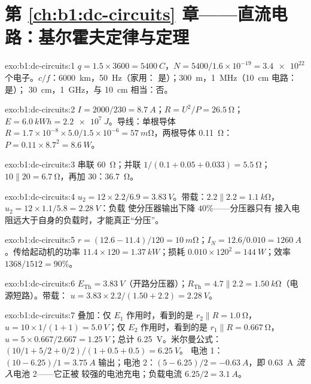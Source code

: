 \section*{第 \ref{ch:b1:dc-circuits} 章——直流电路：基尔霍夫定律与定理}

\begin{solution}{exo:b1:dc-circuits:1}
$q = 1.5 \times 3600 = \qty{5400}{C}$，$N = 5400/1.6\times10^{-19} =
\num{3.4e22}$ 个电子。$c/f$：\qty{6000}{km}，\qty{50}{Hz}（家用：
是）；\qty{300}{m}，\qty{1}{MHz}（\qty{10}{cm} 电路：是）；
\qty{30}{cm}，\qty{1}{GHz}，与 \qty{10}{cm} 相当：否。
\end{solution}

\begin{solution}{exo:b1:dc-circuits:2}
$I = 2000/230 = \qty{8.7}{A}$；$R = U^2/P = \qty{26.5}{\ohm}$；$E =
\qty{6.0}{kWh} = \qty{2.2e7}{J}$。导线：单根导体 $R = 1.7\times10^{-8}
\times 5.0/1.5\times10^{-6} = \qty{57}{m\ohm}$，两根导体
\qty{0.11}{\ohm}：$P = 0.11 \times 8.7^2 = \qty{8.6}{W}$。
\end{solution}

\begin{solution}{exo:b1:dc-circuits:3}
串联 \qty{60}{\ohm}；并联 $1/(0.1 + 0.05 + 0.033) = \qty{5.5}{\ohm}$；
$10 \parallel 20 = \qty{6.7}{\ohm}$，再加 $30$：\qty{36.7}{\ohm}。
\end{solution}

\begin{solution}{exo:b1:dc-circuits:4}
$u_2 = 12 \times 2.2/6.9 = \qty{3.83}{V}$。带载：$2.2 \parallel 2.2 =
\qty{1.1}{k\ohm}$，$u_2 = 12 \times 1.1/5.8 = \qty{2.28}{V}$：负载
使分压器输出下降 $40\%$——分压器只有
接入电阻远大于自身的负载时，才能真正“分压”。
\end{solution}

\begin{solution}{exo:b1:dc-circuits:5}
$r = (12.6 - 11.4)/120 = \qty{10}{m\ohm}$；$I_N = 12.6/0.010 =
\qty{1260}{A}$。传给起动机的功率 $11.4 \times 120 = \qty{1.37}{kW}$；损耗
$0.010 \times 120^2 = \qty{144}{W}$；效率 $1368/1512 = 90\%$。
\end{solution}

\begin{solution}{exo:b1:dc-circuits:6}
$E_{\mathrm{Th}} = \qty{3.83}{V}$（开路分压器）；$R_{\mathrm{Th}}
= 4.7 \parallel 2.2 = \qty{1.50}{k\ohm}$（电源短路）。带载：
$u = 3.83 \times 2.2/(1.50 + 2.2) = \qty{2.28}{V}$。
\end{solution}

\begin{solution}{exo:b1:dc-circuits:7}
叠加：仅 $E_1$ 作用时，看到的是 $r_2 \parallel R = \qty{1.0}{\ohm}$，
$u = 10 \times 1/(1 + 1) = \qty{5.0}{V}$；仅 $E_2$ 作用时，看到的是 $r_1 \parallel R
= \qty{0.667}{\ohm}$，$u = 5 \times 0.667/2.667 = \qty{1.25}{V}$；总计
\qty{6.25}{V}。米尔曼公式：$(10/1 + 5/2 + 0/2)/(1 + 0.5 + 0.5) = \qty{6.25}{V}$。
电池 1：$(10 - 6.25)/1 = \qty{3.75}{A}$ 输出；电池 2：$(5 - 6.25)/2
= \qty{-0.63}{A}$，即 \qty{0.63}{A} \emph{流入}电池 2——它正被
较强的电池充电；负载电流 $6.25/2 = \qty{3.1}{A}$。
\end{solution}

